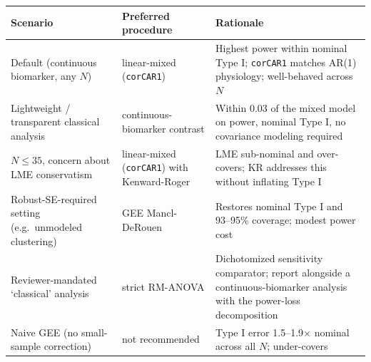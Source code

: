 \documentclass[
  11pt,
]{article}
\newcounter{none} %
\begin{document}
{\def\LTcaptype{none} %
\begin{longtable}[]{@{}
  >{\raggedright\arraybackslash}p{}
  >{\raggedright\arraybackslash}p{}
  >{\raggedright\arraybackslash}p{}@{}}
\toprule\noalign{}
\begin{minipage}[b]{\linewidth}\raggedright
Scenario
\end{minipage} & \begin{minipage}[b]{\linewidth}\raggedright
Preferred procedure
\end{minipage} & \begin{minipage}[b]{\linewidth}\raggedright
Rationale
\end{minipage} \\
\midrule\noalign{}
\endhead
\bottomrule\noalign{}
\endlastfoot
Default (continuous biomarker, any \(N\)) & linear-mixed (\texttt{corCAR1}) & Highest power within nominal Type I; \texttt{corCAR1} matches AR(1) physiology; well-behaved across \(N\) \\
Lightweight / transparent classical analysis & continuous-biomarker contrast & Within 0.03 of the mixed model on power, nominal Type I, no covariance modeling required \\
\(N \le 35\), concern about LME conservatism & linear-mixed (\texttt{corCAR1}) with Kenward-Roger & LME sub-nominal and over-covers; KR addresses this without inflating Type I \\
Robust-SE-required setting (e.g.~unmodeled clustering) & GEE Mancl-DeRouen & Restores nominal Type I and 93--95\% coverage; modest power cost \\
Reviewer-mandated `classical' analysis & strict RM-ANOVA & Dichotomized sensitivity comparator; report alongside a continuous-biomarker analysis with the power-loss decomposition \\
Naive GEE (no small-sample correction) & not recommended & Type I error 1.5--1.9\(\times\) nominal across all \(N\); under-covers \\
\end{longtable}
}
\end{document}
